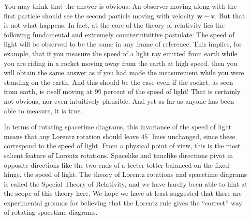 \documentclass{book}
\begin{document}
You may think that the answer is obvious: An observer moving along
with the first particle should see the second particle moving with velocity
$\mathbf{w} - \mathbf{v}$. But that is not what happens. In fact, at the core of the theory of
relativity lies the following fundamental and extremely counterintuitive
postulate: The speed of light will be observed to be the same in any
frame of reference. This implies, for example, that if you measure the
speed of a light ray emitted from earth while you are riding in a rocket
moving away from the earth at high speed, then you will obtain the same
answer as if you had made the measurement while you were standing
on the earth. And this should be the case even if the rocket, as seen
from earth, is itself moving at 99 percent of the speed of light! That is
certainly not obvious, nor even intuitively plausible. And yet as far as
anyone has been able to measure, it is true.

In terms of rotating spacetime diagrams, this invariance of the speed of
light means that any Lorentz rotation should leave $45^{\circ}$ lines unchanged,
since these correspond to the speed of light. From a physical point of
view, this is the most salient feature of Lorentz rotations. Spacelike and
timelike directions pivot in opposite directions like the two ends of a
teeter-totter balanced on the fixed hinge, the speed of light.
The theory of Lorentz rotations and spacetime diagrams is called the
Special Theory of Relativity, and we have hardly been able to hint at
the scope of this theory here. We hope we have at least suggested that
there are experimental grounds for believing that the Lorentz rule gives
the ``correct'' way of rotating spacetime diagrams.
\end{document}
